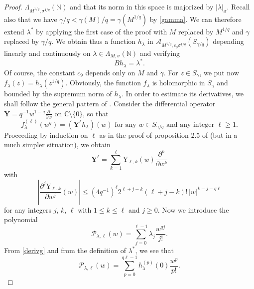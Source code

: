 \documentclass[a4paper]{amsart}
\theoremstyle{plain}
\theoremstyle{definition}
\theoremstyle{remark}
\begin{document}
\begin{proof}
$ \Lambda_{M^{1/q},\sigma^{1/q}}(\mathbb{N}) $ and that its norm in this space is majorized by $ \vert\lambda\vert_\sigma $. Recall also that we have
$ \gamma/q<\gamma(M)/q=\gamma(M^{1/q}) $ by \eqref{gamma}. We can therefore extend $ \lambda^* $ by applying the first case of the proof with $ M $ replaced by $ M^{1/q} $ and $ \gamma $ replaced by $ \gamma/q $. We obtain thus a function $ h_\lambda $ 
in $ \mathcal{A}_{M^{1/q},c_9\sigma^{1/q}}(S_{\gamma/q}) $ depending 
linearly and continuously on $ \lambda \in\Lambda_{M,\sigma}(\mathbb{N}) $ and
verifying
\begin{equation}\label{derivg}
Bh_\lambda=\lambda^*.
\end{equation}
Of course, the constant $ c_9 $ depends only on $ M $ and $ \gamma $.
For $ z\in S_\gamma $, we put now $ f_\lambda(z)=h_\lambda(z^{1/q}) $. Obviously, the function $ f_\lambda $ is holomorphic in $ S_\gamma $ and bounded by the supremum norm of
$ h_\lambda $. In order to estimate its derivatives, we shall follow the general pattern  of \cite{VT2}. Consider the differential operator
$ \mathbf{Y} = q^{-1}w^{1-q}\frac{\partial}{\partial w} $ on $ \mathbb{C}\setminus\{0\} $, so that
\begin{equation}\label{push}
f_\lambda^{(\ell)}(w^q)=(\mathbf{Y}^\ell h_\lambda)(w)\text{ for any }w\in S_{\gamma/q}
\text{ and any integer }\ell\geq 1.
\end{equation}
Proceeding by induction on $ \ell $ as in the proof of proposition 2.5 of \cite{VT2} (but in a much simpler situation), we obtain
\begin{equation*}
\mathbf{Y}^\ell=\sum_{k=1}^\ell\mathrm{Y}_{\ell,k}(w)
\frac{\partial^k}{\partial w^k}
\end{equation*}
with
\begin{equation}\label{iterates}
\left\vert\frac{\partial^j \mathrm{Y}_{\ell,k}}{\partial w^j}(w)
\right\vert\leq
\left(4q^{-1}\right)^\ell 2^{\ell+j-k}(\ell+j-k)!\, \vert w\vert^{k-j-q\ell}
\end{equation}
for any integers $ j $, $k $, $ \ell $ with $ 1\leq k\leq\ell $ and $ j\geq 0 $. Now we introduce the polynomial
\begin{equation}\label{defP}
\mathcal{P}_{\lambda,\ell}(w)=\sum_{j=0}^{\ell-1}\lambda_j\frac{w^{qj}}{j!}.
\end{equation}
From \eqref{derivg} and from the definition of $ \lambda^* $, we see that
\begin{equation*}
\mathcal{P}_{\lambda,\ell}(w)=\sum_{p=0}^{q\ell-1}h_\lambda^{(p)}(0)\frac{w^p}{p!}.
\end{equation*}

\end{proof}
\end{document}
